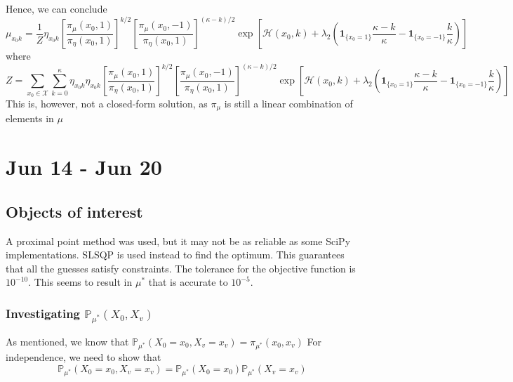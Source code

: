 \documentclass[12pt]{article}
\numberwithin{equation}{section}
\begin{document}
Hence, we can conclude
\begin{equation*}
    \mu_{x_0k} = \frac1Z \eta_{x_0k} \left[\frac{\pi_\mu(x_0, 1)}{\pi_\eta(x_0, 1)}\right]^{k/2} \left[\frac{\pi_\mu(x_0, -1)}{\pi_\eta(x_0, 1)}\right]^{(\kappa - k)/2} \exp\left[\mathcal{H}(x_0, k) + \lambda_2 \left(\mathbf{1}_{\{x_0=1\}}\frac{\kappa - k}{\kappa} -
        \mathbf{1}_{\{x_0=-1\}}\frac{k}{\kappa}\right)\right]
\end{equation*}
where
\begin{equation*}
    Z = \sum_{x_0\in\mathcal{X}}\sum_{k=0}^\kappa \eta_{x_0k} \eta_{x_0k} \left[\frac{\pi_\mu(x_0, 1)}{\pi_\eta(x_0, 1)}\right]^{k/2} \left[\frac{\pi_\mu(x_0, -1)}{\pi_\eta(x_0, 1)}\right]^{(\kappa - k)/2} \exp\left[\mathcal{H}(x_0, k) + \lambda_2 \left(\mathbf{1}_{\{x_0=1\}}\frac{\kappa - k}{\kappa} -
        \mathbf{1}_{\{x_0=-1\}}\frac{k}{\kappa}\right)\right]
\end{equation*}
This is, however, not a closed-form solution, as $\pi_\mu$ is still a linear combination of elements in $\mu$

\pagebreak

\section{Jun 14 - Jun 20}

\subsection{Objects of interest}

A proximal point method was used, but it may not be as reliable as some SciPy implementations. SLSQP is used instead
to find the optimum. This guarantees that all the guesses satisfy constraints. The tolerance for the objective function is $10^{-10}$.
This seems to result in $\mu^*$ that is accurate to $10^{-5}$.

\subsubsection{Investigating $\mathbb{P}_{\mu^*}(X_0, X_v)$}

As mentioned, we know that $\mathbb{P}_{\mu^*}(X_0=x_0, X_v=x_v) = \pi_{\mu^*}(x_0, x_v)$
For independence, we need to show that
\begin{equation*}
    \mathbb{P}_{\mu^*}(X_0=x_0, X_v=x_v) =  \mathbb{P}_{\mu^*}(X_0=x_0) \mathbb{P}_{\mu^*}(X_v=x_v)
\end{equation*}
\end{document}
